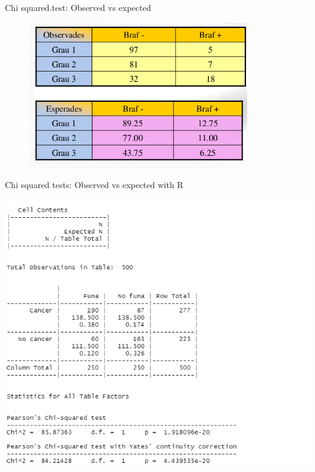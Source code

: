 \documentclass[
  ignorenonframetext,
]{beamer}
\newenvironment{Shaded}{\begin{snugshade}}{\end{snugshade}}
\newcommand{\AttributeTok}[1]{\textcolor[rgb]{0.77,0.63,0.00}{#1}}
\newcommand{\FunctionTok}[1]{\textcolor[rgb]{0.00,0.00,0.00}{#1}}
\newcommand{\NormalTok}[1]{#1}
\newcommand{\OtherTok}[1]{\textcolor[rgb]{0.56,0.35,0.01}{#1}}
\newcommand{\SpecialCharTok}[1]{\textcolor[rgb]{0.00,0.00,0.00}{#1}}
\begin{document}
\begin{frame}{Chi squared.test: Observed vs expected}
\protect\hypertarget{chi-squared.test-observed-vs-expected}{}
\begin{figure}
\includegraphics[width=0.8\linewidth]{images/observedvsexpected} \end{figure}
\end{frame}

\begin{frame}[fragile]{Chi squared tests: Observed vs expected with R}
\protect\hypertarget{chi-squared-tests-observed-vs-expected-with-r}{}
\begin{Shaded}
\end{Shaded}

\includegraphics{images/chi.PNG}
\end{frame}
\end{document}
